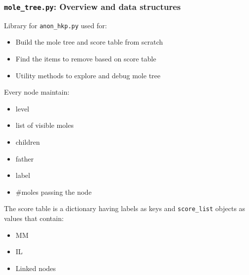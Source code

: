 \documentclass{beamer}
\begin{document}
\begin{frame}[fragile]
\frametitle{\texttt{mole\_tree.py}: Overview and data structures}
Library for \texttt{anon\_hkp.py} used for:
    \begin{itemize}
        \item Build the mole tree and score table from scratch
        \item Find the items to remove based on score table 
        \item Utility methods to explore and debug mole tree
    \end{itemize}
Every node maintain:
    \begin{multicols}{2}
    \begin{itemize}
        \item level
        \item list of visible moles
        \item children
        \item father
        \item label
        \item \#moles passing the node
    \end{itemize}
    \end{multicols}
The score table is a dictionary having labels as keys and \texttt{score\_list} objects as values that contain:
    \begin{multicols}{3}
    \begin{itemize}
        \item MM
        \item IL
        \item Linked nodes
    \end{itemize}
    \end{multicols}

\end{frame}
\end{document}
